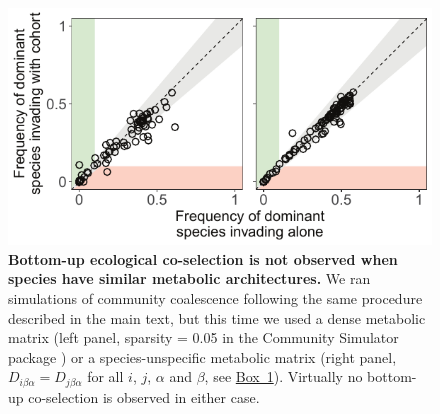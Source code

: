 \documentclass[a4paper,10pt]{article}
\begin{document}
\begin{figure}[!h]
\centering
\internallinenumbers
\includegraphics[scale=0.9,keepaspectratio]{figs/figS4.pdf}
\caption{\textbf{Bottom-up ecological co-selection is not observed
when species have similar metabolic architectures.}
We ran simulations of community coalescence following the same
procedure described in the main text, but this time we
used a dense metabolic matrix
(left panel,
sparsity = 0.05 in the Community Simulator package \cite{Marsland2020})
or a species-unspecific metabolic matrix
(right panel,
$D_{i\beta\alpha}=D_{j\beta\alpha}$ for all $i$, $j$, $\alpha$ and $\beta$,
see \hyperref[box1]{Box~1}).
Virtually no bottom-up co-selection is observed in either case.}
\label{figS4}
\end{figure}

\clearpage
\end{document}
